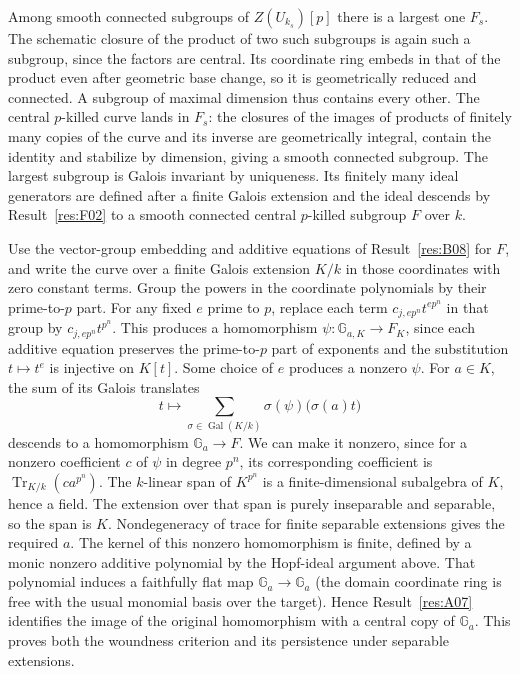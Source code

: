 \documentclass[11pt,a4paper,openany,oneside]{book}
\theoremstyle{resultstyle}
\theoremstyle{definition}
\numberwithin{equation}{chapter}
\begin{document}
Among smooth connected subgroups of \(Z(U_{k_s})[p]\) there is a
largest one \(F_s\). The schematic closure of the product of
two such subgroups is again such a subgroup, since the factors
are central. Its coordinate ring embeds in that of the product
even after geometric base change, so it is geometrically
reduced and connected. A subgroup of maximal dimension thus
contains every other. The central \(p\)-killed curve lands in
\(F_s\): the closures of the images of products of finitely
many copies of the curve and its inverse are geometrically
integral, contain the identity and stabilize by dimension,
giving a smooth connected subgroup. The largest subgroup is
Galois invariant by uniqueness. Its finitely many ideal
generators are defined after a finite Galois extension and
the ideal descends by Result~\ref{res:F02} to a smooth
connected central \(p\)-killed subgroup \(F\) over \(k\).

Use the vector-group embedding and additive equations of
Result~\ref{res:B08} for \(F\), and write the curve over a
finite Galois extension \(K/k\) in those coordinates with zero
constant terms. Group the powers in the coordinate polynomials
by their prime-to-\(p\) part. For any fixed \(e\) prime to \(p\),
replace each term \(c_{j,ep^n}t^{ep^n}\) in that group by
\(c_{j,ep^n}t^{p^n}\). This produces a homomorphism
\(\psi:\mathbb G_{a,K}\to F_K\), since each additive equation
preserves the prime-to-\(p\) part of exponents and the
substitution \(t\mapsto t^e\) is injective on \(K[t]\).
Some choice of \(e\) produces a nonzero \(\psi\).
For \(a\in K\), the sum of its Galois translates
\[
 t\longmapsto
 \sum_{\sigma\in\operatorname{Gal}(K/k)}
       \sigma(\psi)\bigl(\sigma(a)t\bigr)
\]
descends to a homomorphism \(\mathbb G_a\to F\). We can make it
nonzero, since for a nonzero coefficient \(c\) of \(\psi\) in
degree \(p^n\), its corresponding coefficient is
\(\operatorname{Tr}_{K/k}(ca^{p^n})\). The \(k\)-linear
span of \(K^{p^n}\) is a finite-dimensional subalgebra of
\(K\), hence a field. The extension over that span is purely
inseparable and separable, so the span is \(K\). Nondegeneracy
of trace for finite separable extensions gives the required
\(a\). The kernel of this nonzero homomorphism is finite,
defined by a monic nonzero additive polynomial by the Hopf-ideal
argument above. That polynomial induces a faithfully flat map
\(\mathbb G_a\to\mathbb G_a\) (the domain coordinate ring is
free with the usual monomial basis over the target). Hence
Result~\ref{res:A07} identifies the image of the original
homomorphism with a central copy of \(\mathbb G_a\).
This proves both the woundness criterion and its persistence
under separable extensions.
\end{document}
